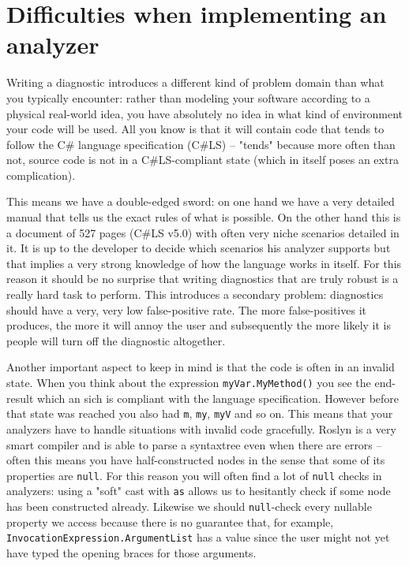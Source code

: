 \section{Difficulties when implementing an analyzer}
\label{sec:diagnostic-difficulties}

Writing a diagnostic introduces a different kind of problem domain than what you typically encounter: rather than modeling your software according to a physical real-world idea, you have absolutely no idea in what kind of environment your code will be used. All you know is that it will contain code that tends to follow the C\# language specification (C\#LS) -- "tends" because more often than not, source code is not in a C\#LS-compliant state (which in itself poses an extra complication). 

This means we have a double-edged sword: on one hand we have a very detailed manual that tells us the exact rules of what is possible. On the other hand this is a document of 527 pages (C\#LS v5.0) with often very niche scenarios detailed in it. It is up to the developer to decide which scenarios his analyzer supports but that implies a very strong knowledge of how the language works in itself. For this reason it should be no surprise that writing diagnostics that are truly robust is a really hard task to perform. This introduces a secondary problem: diagnostics should have a very, very low false-positive rate. The more false-positives it produces, the more it will annoy the user and subsequently the more likely it is people will turn off the diagnostic altogether.

Another important aspect to keep in mind is that the code is often in an invalid state. When you think about the expression \texttt{myVar.MyMethod()} you see the end-result which an sich is compliant with the language specification. However before that state was reached you also had \texttt{m}, \texttt{my}, \texttt{myV} and so on. This means that your analyzers have to handle situations with invalid code gracefully. Roslyn is a very smart compiler and is able to parse a \gls{syntaxtree} even when there are errors -- often this means you have half-constructed nodes in the sense that some of its properties are \texttt{null}. For this reason you will often find a lot of \texttt{null} checks in analyzers: using a "soft" cast with \texttt{as} allows us to hesitantly check if some node has been constructed already. Likewise we should \texttt{null}-check every nullable property we access because there is no guarantee that, for example, \texttt{InvocationExpression.ArgumentList} has a value since the user might not yet have typed the opening braces for those arguments.

